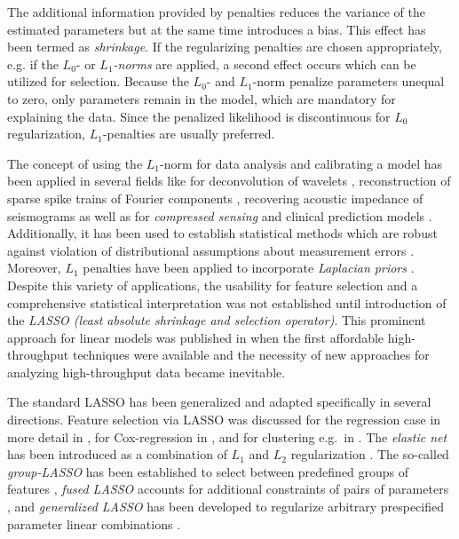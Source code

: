 \documentclass{bioinfo}
\begin{document}
The additional information provided by penalties reduces the variance of the estimated parameters but at the same time introduces a bias. This effect has been termed as \emph{shrinkage}. 
If the regularizing penalties are chosen appropriately, e.g. if the \emph{$L_0$}- or \emph{$L_1$-norms} are applied, a second effect occurs which can be utilized for selection. 
Because the $L_0$- and $L_1$-norm penalize parameters unequal to zero, only parameters remain in the model, which are mandatory for explaining the data. 
Since the penalized likelihood is discontinuous for $L_0$ regularization, $L_1$-penalties are usually preferred.

The concept of using the $L_1$-norm for data analysis and calibrating a model has been applied in several fields like for deconvolution of wavelets \citep{Taylor1979}, 
reconstruction of sparse spike trains of Fourier components \citep{Levy1981}, recovering acoustic impedance of seismograms \citep{Oldenburg1983} 
as well as for \emph{compressed sensing} \citep{Candes2008,Cheng2015} and clinical prediction models \citep{Hothorn2006}. 
Additionally, it has been used to establish statistical methods which are robust against violation of distributional assumptions about measurement errors \citep{Claerbout73, Barrodale1973}. Moreover, $L_1$ penalties have been applied to incorporate \emph{Laplacian priors} \citep{xx}. 
%
Despite this variety of applications, the usability for feature selection and a comprehensive statistical interpretation was not established until introduction of the 
\emph{LASSO (least absolute shrinkage and selection operator)}. 
This prominent approach for linear models was published in \cite{Tibshirani94} when the first affordable high-throughput techniques were available and the necessity of new approaches for analyzing high-throughput data became inevitable.

The standard LASSO has been generalized and adapted specifically in several directions. 
Feature selection via LASSO was discussed for the regression case in more detail in \cite{tibshirani96}, for Cox-regression in \cite{Tibshirani1997}, and for clustering e.g.~in \cite{Witten2010}.
The \emph{elastic net} has been introduced as a combination of $L_1$ and $L_2$ regularization \citep{Zou05}. 
The so-called  \emph{group-LASSO} has been established to select between predefined groups of features \citep{Yuan2006}, \emph{fused LASSO} accounts for additional constraints of pairs of parameters \citep{Tibshirani2005}, and  \emph{generalized LASSO} has been developed to regularize arbitrary prespecified parameter linear combinations \citep{Tibshirani2011}.
\end{document}
